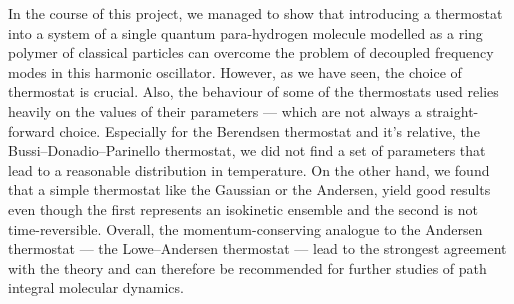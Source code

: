 In the course of this project, we managed to show that introducing a thermostat into a system of a single quantum para-hydrogen molecule modelled as a ring polymer of classical particles can overcome the problem of decoupled frequency modes in this harmonic oscillator. However, as we have seen, the choice of thermostat is crucial. Also, the behaviour of some of the thermostats used relies heavily on the values of their parameters --- which are not always a straight-forward choice. Especially for the Berendsen thermostat and it's relative, the Bussi--Donadio--Parinello thermostat, we did not find a set of parameters that lead to a reasonable distribution in temperature. 
On the other hand, we found that a simple thermostat like the Gaussian or the Andersen, yield good results even though the first represents an isokinetic ensemble and the second is not time-reversible. Overall, the momentum-conserving analogue to the Andersen thermostat --- the Lowe--Andersen thermostat --- lead to the strongest agreement with the theory and can therefore be recommended for further studies of path integral molecular dynamics.    